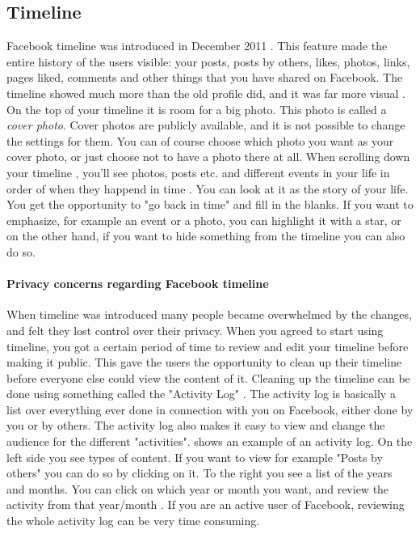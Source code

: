 \subsection{Timeline}
\label{subsec:timeline}
Facebook timeline was introduced in December 2011 \cite{EvolutionOfFacebook}. This feature made the entire history of the users visible: your posts, posts by others, likes, photos, links, pages liked, comments and other things that you have shared on Facebook. The timeline showed much more than the old profile did, and it was far more visual \cite{timeline}. On the top of your timeline it is room for a big photo. This photo is called a \emph{cover photo}. Cover photos are publicly available, and it is not possible to change the settings for them. You can of course choose which photo you want as your cover photo, or just choose not to have a photo there at all. When scrolling down your timeline , you'll see photos, posts etc. and different events in your life in order of when they happend in time \cite{timeline}. You can look at it as the story of your life. You get the opportunity to "go back in time" and fill in the blanks. If you want to emphasize, for example an event or a photo, you can highlight it with a star, or on the other hand, if you want to hide something from the timeline you can also do so. 

\paragraph{Privacy concerns regarding Facebook timeline}
When timeline was introduced many people became overwhelmed by the changes, and felt they lost control over their privacy. When you agreed to start using timeline, you got a certain period of time to review and edit your timeline before making it public. This gave the users the opportunity to clean up their timeline before everyone else could view the content of it. Cleaning up the timeline can be done using something called the "Activity Log" \cite{activitylog}. The activity log is basically a list over everything ever done in connection with you on Facebook, either done by you or by others. The activity log also makes it easy to view and change the audience for the different "activities".  shows an example of an activity log. On the left side you see types of content. If you want to view for example "Posts by others" you can do so by clicking on it. To the right you see a list of the years and months. You can click on which year or month you want, and review the activity from that year/month \cite{activitylog}. If you are an active user of Facebook, reviewing the whole activity log can be very time consuming. 

